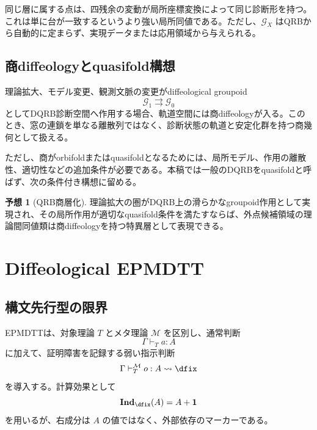 \documentclass[a4paper,11pt]{ltjsarticle}
\theoremstyle{definition}
\newtheorem{conjecture}[definition]{予想}
\theoremstyle{plain}
\newcommand{\Ind}{\mathbf{Ind}_{\dfix}}
\newcommand{\Meta}{\mathcal M}
\newcommand{\Unit}{\mathbf 1}
\begin{document}
同じ層に属する点は、四残余の変動が局所座標変換によって同じ診断形を持つ。これは単に台が一致するというより強い局所同値である。ただし、$\mathcal G_X$ はQRBから自動的に定まらず、実現データまたは応用領域から与えられる。

\subsection{商diffeologyとquasifold構想}

理論拡大、モデル変更、観測文脈の変更がdiffeological groupoid
\begin{equation}
 \mathcal G_1\rightrightarrows\mathcal G_0
 \end{equation}
としてDQRB診断空間へ作用する場合、軌道空間には商diffeologyが入る。このとき、窓の連鎖を単なる離散列ではなく、診断状態の軌道と安定化群を持つ商幾何として扱える。

ただし、商がorbifoldまたはquasifoldとなるためには、局所モデル、作用の離散性、適切性などの追加条件が必要である。本稿では一般のDQRBをquasifoldと呼ばず、次の条件付き構想に留める。

\begin{conjecture}[QRB商層化]
理論拡大の圏がDQRB上の滑らかなgroupoid作用として実現され、その局所作用が適切なquasifold条件を満たすならば、外点候補領域の理論間同値類は商diffeologyを持つ特異層として表現できる。
\end{conjecture}

\section{Diffeological EPMDTT}

\subsection{構文先行型の限界}

EPMDTTは、対象理論 $T$ とメタ理論 $\Meta$ を区別し、通常判断
\begin{equation}
 \Gamma\vdash_T a:A
\end{equation}
に加えて、証明障害を記録する弱い指示判断
\begin{equation}
 \Gamma\vdash_T^{\Meta}o:A\rightsquigarrow\dfix
 \label{eq:weak-indication}
\end{equation}
を導入する。計算効果として
\begin{equation}
 \Ind(A)=A+\Unit
 \label{eq:indication-monad}
\end{equation}
を用いるが、右成分は $A$ の値ではなく、外部依存のマーカーである\cite{ChibaEPMDTT2026}。
\end{document}
